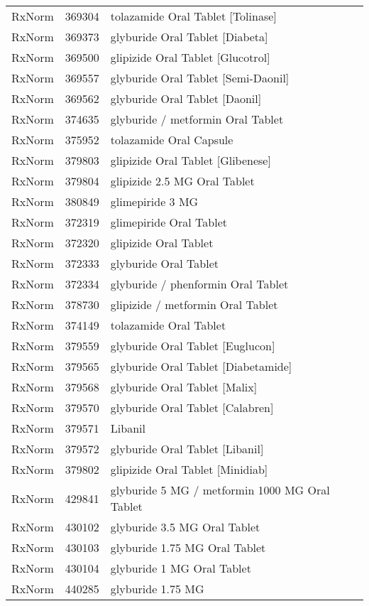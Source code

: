 \begin{longtable}{p{}p{}p{}}
  RxNorm & 369304 & tolazamide Oral Tablet [Tolinase] \\ 
  RxNorm & 369373 & glyburide Oral Tablet [Diabeta] \\ 
  RxNorm & 369500 & glipizide Oral Tablet [Glucotrol] \\ 
  RxNorm & 369557 & glyburide Oral Tablet [Semi-Daonil] \\ 
  RxNorm & 369562 & glyburide Oral Tablet [Daonil] \\ 
  RxNorm & 374635 & glyburide / metformin Oral Tablet \\ 
  RxNorm & 375952 & tolazamide Oral Capsule \\ 
  RxNorm & 379803 & glipizide Oral Tablet [Glibenese] \\ 
  RxNorm & 379804 & glipizide 2.5 MG Oral Tablet \\ 
  RxNorm & 380849 & glimepiride 3 MG \\ 
  RxNorm & 372319 & glimepiride Oral Tablet \\ 
  RxNorm & 372320 & glipizide Oral Tablet \\ 
  RxNorm & 372333 & glyburide Oral Tablet \\ 
  RxNorm & 372334 & glyburide / phenformin Oral Tablet \\ 
  RxNorm & 378730 & glipizide / metformin Oral Tablet \\ 
  RxNorm & 374149 & tolazamide Oral Tablet \\ 
  RxNorm & 379559 & glyburide Oral Tablet [Euglucon] \\ 
  RxNorm & 379565 & glyburide Oral Tablet [Diabetamide] \\ 
  RxNorm & 379568 & glyburide Oral Tablet [Malix] \\ 
  RxNorm & 379570 & glyburide Oral Tablet [Calabren] \\ 
  RxNorm & 379571 & Libanil \\ 
  RxNorm & 379572 & glyburide Oral Tablet [Libanil] \\ 
  RxNorm & 379802 & glipizide Oral Tablet [Minidiab] \\ 
  RxNorm & 429841 & glyburide 5 MG / metformin 1000 MG Oral Tablet \\ 
  RxNorm & 430102 & glyburide 3.5 MG Oral Tablet \\ 
  RxNorm & 430103 & glyburide 1.75 MG Oral Tablet \\ 
  RxNorm & 430104 & glyburide 1 MG Oral Tablet \\ 
  RxNorm & 440285 & glyburide 1.75 MG \\ 

\end{longtable}

